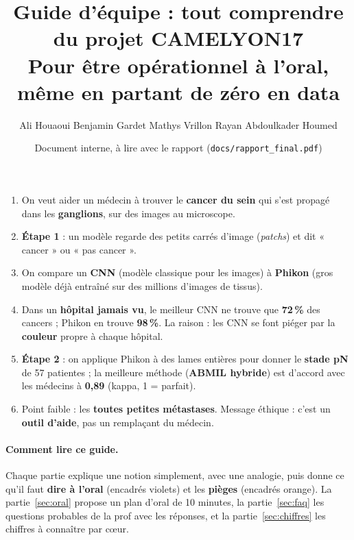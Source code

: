 \documentclass[11pt,a4paper]{article}
\title{\vspace{-1.3cm}\textbf{\color{bleu}Guide d'équipe : tout comprendre du projet CAMELYON17}\\[4pt]
\large Pour être opérationnel à l'oral, même en partant de zéro en data}
\author{Ali Houaoui \quad Benjamin Gardet \quad Mathys Vrillon \quad Rayan Abdoulkader Houmed}
\date{Document interne, à lire avec le rapport (\texttt{docs/rapport\_final.pdf})}
\begin{document}
\maketitle
\thispagestyle{fancy}

\begin{retenir}
\begin{enumerate}
  \item On veut aider un médecin à trouver le \textbf{cancer du sein} qui s'est propagé dans les \textbf{ganglions}, sur des images
        au microscope.
  \item \textbf{Étape 1} : un modèle regarde des petits carrés d'image (\emph{patchs}) et dit « cancer » ou « pas cancer ».
  \item On compare un \textbf{CNN} (modèle classique pour les images) à \textbf{Phikon} (gros modèle déjà entraîné sur des millions
        d'images de tissus).
  \item Dans un \textbf{hôpital jamais vu}, le meilleur CNN ne trouve que \textbf{72\,\%} des cancers ; Phikon en trouve \textbf{98\,\%}.
        La raison : les CNN se font piéger par la \textbf{couleur} propre à chaque hôpital.
  \item \textbf{Étape 2} : on applique Phikon à des lames entières pour donner le \textbf{stade pN} de 57 patientes ; la meilleure
        méthode (\textbf{ABMIL hybride}) est d'accord avec les médecins à \textbf{0,89} (kappa, 1 = parfait).
  \item Point faible : les \textbf{toutes petites métastases}. Message éthique : c'est un \textbf{outil d'aide}, pas un remplaçant du médecin.
\end{enumerate}
\end{retenir}

\paragraph{Comment lire ce guide.} Chaque partie explique une notion simplement, avec une analogie, puis donne ce qu'il faut
\textbf{dire à l'oral} (encadrés violets) et les \textbf{pièges} (encadrés orange). La partie~\ref{sec:oral} propose un plan
d'oral de 10 minutes, la partie~\ref{sec:faq} les questions probables de la prof avec les réponses, et la partie~\ref{sec:chiffres}
les chiffres à connaître par cœur.
\end{document}
